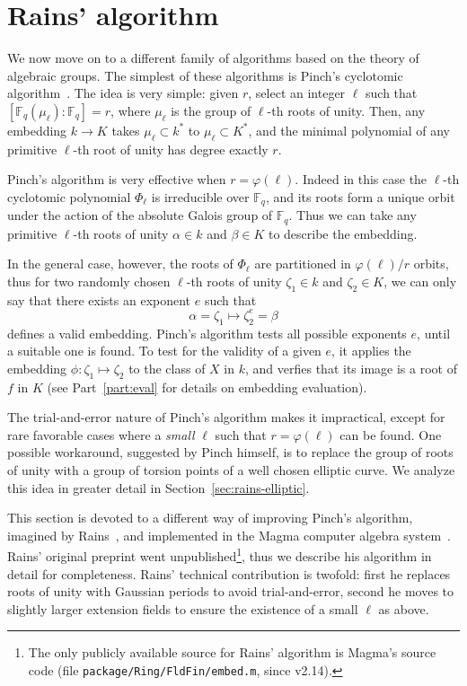 \documentclass[12pt]{article}
\theoremstyle{plain}
\theoremstyle{definition}
\def\F{\ensuremath{\mathbb{F}}}
\def\euler{\ensuremath{\varphi}}
\newcounter{algorithm}
\begin{document}
\section{Rains' algorithm}

We now move on to a different family of algorithms based on the theory of
algebraic groups. The simplest of these algorithms is Pinch's
cyclotomic algorithm~\cite{Pinch}. The idea is very simple: given $r$,
select an integer $\ell$ such that $[\F_q(\mu_\ell):\F_q]=r$, where
$\mu_\ell$ is the group of $\ell$-th roots of unity.  Then, any
embedding $k\to K$ takes $\mu_\ell\subset k^\ast$ to $\mu_\ell\subset
K^\ast$, and the minimal polynomial of any primitive $\ell$-th root of
unity has degree exactly $r$.

Pinch's algorithm is very effective when $r=\euler(\ell)$. Indeed in
this case the $\ell$-th cyclotomic polynomial $\Phi_\ell$ is
irreducible over $\F_q$, and its roots form a unique orbit under the
action of the absolute Galois group of $\F_q$. Thus we can take any
primitive $\ell$-th roots of unity $\alpha\in k$ and $\beta\in K$ to
describe the embedding.

In the general case, however, the roots of $\Phi_\ell$ are partitioned
in $\euler(\ell)/r$ orbits, thus for two randomly chosen $\ell$-th
roots of unity $\zeta_1\in k$ and $\zeta_2\in K$, we can only say that
there exists an exponent $e$ such that
\begin{equation*}
  \alpha = \zeta_1 \mapsto \zeta_2^e = \beta
\end{equation*}
defines a valid embedding. Pinch's algorithm tests all possible
exponents $e$, until a suitable one is found. To test for the validity
of a given $e$, it applies the embedding $\phi:\zeta_1\mapsto\zeta_2$
to the class of $X$ in $k$, and verfies that its image is a root of
$f$ in $K$ (see Part~\ref{part:eval} for details on embedding
evaluation).

The trial-and-error nature of Pinch's algorithm makes it impractical,
except for rare favorable cases where a \emph{small} $\ell$ such that
$r=\euler(\ell)$ can be found. One possible workaround, suggested by
Pinch himself, is to replace the group of roots of unity with a group
of torsion points of a well chosen elliptic curve. We analyze this
idea in greater detail in Section~\ref{sec:rains-elliptic}.

This section is devoted to a different way of improving Pinch's
algorithm, imagined by Rains~\cite{rains2008}, and implemented in the
Magma computer algebra system~\cite{MAGMA}. Rains' original preprint
went unpublished\footnote{The only publicly available source for
  Rains' algorithm is Magma's source code (file
  \texttt{package/Ring/FldFin/embed.m}, since v2.14).}, thus we
describe his algorithm in detail for completeness. Rains' technical
contribution is twofold: first he replaces roots of unity with
Gaussian periods to avoid trial-and-error, second he moves to slightly
larger extension fields to ensure the existence of a small $\ell$ as
above.
\end{document}
